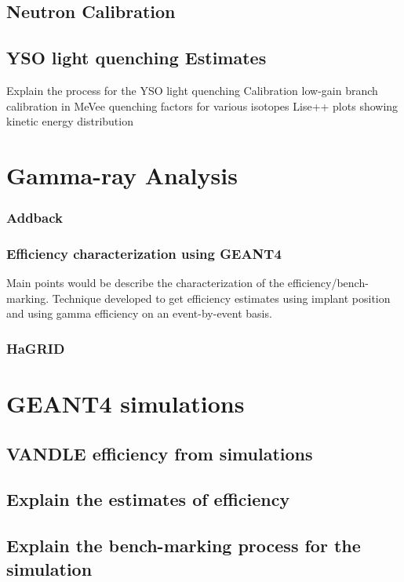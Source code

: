 \documentclass[a4paper,12pt,twoside]{report}
\begin{document}
\subsection{Neutron Calibration}
\subsection{YSO light quenching Estimates}

Explain the process for the YSO light quenching
Calibration
low-gain branch calibration in MeVee
quenching factors for various isotopes 
Lise++ plots showing kinetic energy distribution

\section{Gamma-ray Analysis}
\subsubsection{Addback}
\subsubsection{Efficiency characterization using GEANT4}
Main points would be describe the characterization of the efficiency/bench-marking.
Technique developed to get efficiency estimates using implant position and using gamma efficiency on an event-by-event basis. 
\subsubsection{HaGRID}

\section{GEANT4 simulations}

\subsection{VANDLE efficiency from simulations}

\subsection{Explain the estimates of efficiency}
\subsection{Explain the bench-marking process for the simulation}
\end{document}
